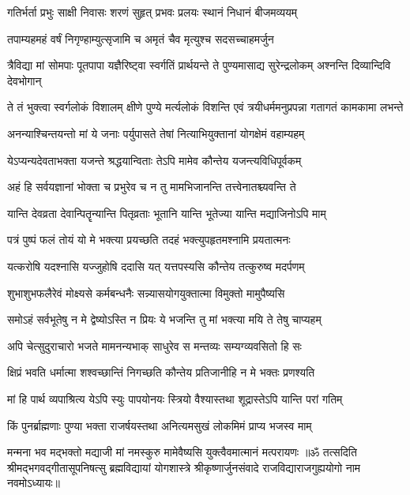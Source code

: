 \twolineshloka
{गतिर्भर्ता प्रभुः साक्षी निवासः शरणं सुहृत्}
{प्रभवः प्रलयः स्थानं निधानं बीजमव्ययम्}%

\twolineshloka
{तपाम्यहमहं वर्षं निगृण्हाम्युत्सृजामि च}
{अमृतं चैव मृत्युश्च सदसच्चाहमर्जुन}%

\fourlineindentedshloka
{त्रैविद्या मां सोमपाः पूतपापा}
{यज्ञैरिष्ट्वा स्वर्गतिं प्रार्थयन्ते}
{ते पुण्यमासाद्य सुरेन्द्रलोकम्}
{अश्नन्ति दिव्यान्दिवि देवभोगान्}%

\fourlineindentedshloka
{ते तं भुक्त्वा स्वर्गलोकं विशालम्}
{क्षीणे पुण्ये मर्त्यलोकं विशन्ति}
{एवं त्रयीधर्ममनुप्रपन्ना}
{गतागतं कामकामा लभन्ते}%

\twolineshloka
{अनन्याश्चिन्तयन्तो मां ये जनाः पर्युपासते}
{तेषां नित्याभियुक्तानां योगक्षेमं वहाम्यहम्}%

\twolineshloka
{येऽप्यन्यदेवताभक्ता यजन्ते श्रद्धयान्विताः}
{तेऽपि मामेव कौन्तेय यजन्त्यविधिपूर्वकम्}%

\twolineshloka
{अहं हि सर्वयज्ञानां भोक्ता च प्रभुरेव च}
{न तु मामभिजानन्ति तत्त्वेनातश्च्यवन्ति ते}%

\twolineshloka
{यान्ति देवव्रता देवान्पितॄन्यान्ति पितृव्रताः}
{भूतानि यान्ति भूतेज्या यान्ति मद्याजिनोऽपि माम्}%

\twolineshloka
{पत्रं पुष्पं फलं तोयं यो मे भक्त्या प्रयच्छति}
{तदहं भक्त्युपहृतमश्नामि प्रयतात्मनः}%

\twolineshloka
{यत्करोषि यदश्नासि यज्जुहोषि ददासि यत्}
{यत्तपस्यसि कौन्तेय तत्कुरुष्व मदर्पणम्}%

\twolineshloka
{शुभाशुभफलैरेवं मोक्ष्यसे कर्मबन्धनैः}
{सन्न्यासयोगयुक्तात्मा विमुक्तो मामुपैष्यसि}%

\twolineshloka
{समोऽहं सर्वभूतेषु न मे द्वेष्योऽस्ति न प्रियः}
{ये भजन्ति तु मां भक्त्या मयि ते तेषु चाप्यहम्}%

\twolineshloka
{अपि चेत्सुदुराचारो भजते मामनन्यभाक्}
{साधुरेव स मन्तव्यः सम्यग्व्यवसितो हि सः}%

\twolineshloka
{क्षिप्रं भवति धर्मात्मा शश्वच्छान्तिं निगच्छति}
{कौन्तेय प्रतिजानीहि न मे भक्तः प्रणश्यति}%

\twolineshloka
{मां हि पार्थ व्यपाश्रित्य येऽपि स्युः पापयोनयः}
{स्त्रियो वैश्यास्तथा शूद्रास्तेऽपि यान्ति परां गतिम्}%

\twolineshloka
{किं पुनर्ब्राह्मणाः पुण्या भक्ता राजर्षयस्तथा}
{अनित्यमसुखं लोकमिमं प्राप्य भजस्व माम्}%

\twolineshloka
{मन्मना भव मद्भक्तो मद्याजी मां नमस्कुरु}
{मामेवैष्यसि युक्त्वैवमात्मानं मत्परायणः}%
{॥ॐ तत्सदिति श्रीमद्भगवद्गीतासूपनिषत्सु ब्रह्मविद्यायां योगशास्त्रे श्रीकृष्णार्जुनसंवादे राजविद्याराजगुह्ययोगो नाम नवमोऽध्यायः॥}

